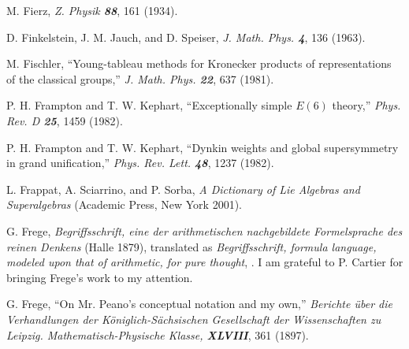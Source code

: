  M. Fierz,
{\em Z. Physik   \bf 88}, 161 (1934).

D. Finkelstein, J. M. Jauch, and D. Speiser,
{\em J. Math. Phys.  \bf 4}, 136 (1963).

 M. Fischler,
``Young-tableau methods for Kronecker products of representations of the
classical groups,''
{\em J. Math. Phys.   \bf 22}, 637 (1981).




P. H. Frampton and T. W. Kephart,
``Exceptionally simple $E(6)$ theory,''
{\em Phys.  Rev.    D \bf 25}, 1459 (1982).

P. H. Frampton and T. W. Kephart,
``Dynkin weights and global supersymmetry in grand unification,''
{\em Phys.  Rev.  Lett.    \bf 48}, 1237 (1982).

 L. Frappat, A. Sciarrino, and P. Sorba,
    {\em A Dictionary of Lie Algebras and Superalgebras}
    (Academic Press, New York 2001).

 G. Frege,
    {\em Begriffsschrift, eine der arithmetischen
    nachgebildete Formelsprache des reinen Denkens} (Halle 1879),
    translated as {\em  Begriffsschrift, formula language, modeled upon that
    of arithmetic, for pure thought},
    . I am grateful to P. Cartier for bringing
    Frege's work to my attention.

 G. Frege,
    ``On Mr. Peano's conceptual notation and my own,''
    {\em Berichte \"uber die Verhandlungen der
     K\"oniglich-S\"achsischen Gesellschaft
    der Wissenschaften zu Leipzig. Mathematisch-Physische Klasse,
    \bf XLVIII}, 361 (1897). %

